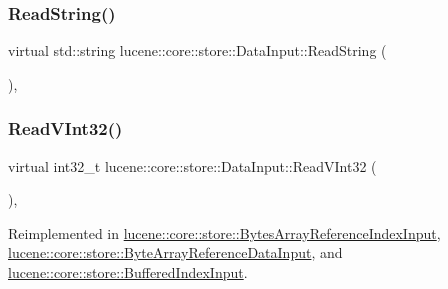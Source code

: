 \mbox{\label{classlucene_1_1core_1_1store_1_1DataInput_a86a272d3eaf2f18b68669ce8eb181c85}} 
\subsubsection{\texorpdfstring{Read\+String()}{ReadString()}}
{\footnotesize\ttfamily virtual std\+::string lucene\+::core\+::store\+::\+Data\+Input\+::\+Read\+String (\begin{DoxyParamCaption}{ }\end{DoxyParamCaption})\hspace{0.3cm}{\ttfamily [inline]}, {\ttfamily [virtual]}}

\mbox{\label{classlucene_1_1core_1_1store_1_1DataInput_aa4539e00fc3d2735814a6656455ac74b}} 
\subsubsection{\texorpdfstring{Read\+V\+Int32()}{ReadVInt32()}}
{\footnotesize\ttfamily virtual int32\+\_\+t lucene\+::core\+::store\+::\+Data\+Input\+::\+Read\+V\+Int32 (\begin{DoxyParamCaption}{ }\end{DoxyParamCaption})\hspace{0.3cm}{\ttfamily [inline]}, {\ttfamily [virtual]}}



Reimplemented in \mbox{\hyperlink{classlucene_1_1core_1_1store_1_1BytesArrayReferenceIndexInput_a44ae6dbf65e69e5a2a414c02687e4d47}{lucene\+::core\+::store\+::\+Bytes\+Array\+Reference\+Index\+Input}}, \mbox{\hyperlink{classlucene_1_1core_1_1store_1_1ByteArrayReferenceDataInput_a2d9ccc48e09d9794d2ca2ae3577bd44b}{lucene\+::core\+::store\+::\+Byte\+Array\+Reference\+Data\+Input}}, and \mbox{\hyperlink{classlucene_1_1core_1_1store_1_1BufferedIndexInput_ad1ab15db89ccb21f3b777874dfe8534b}{lucene\+::core\+::store\+::\+Buffered\+Index\+Input}}.

